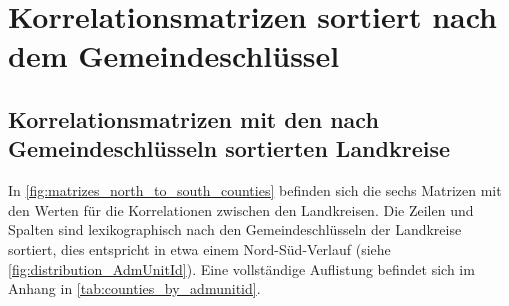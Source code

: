 \section{Korrelationsmatrizen sortiert nach dem Gemeindeschlüssel}
\subsection{Korrelationsmatrizen mit den nach Gemeindeschlüsseln sortierten Landkreise}
In \autoref{fig:matrizes_north_to_south_counties} befinden sich die sechs Matrizen mit den Werten für die Korrelationen zwischen den Landkreisen.
Die Zeilen und Spalten sind lexikographisch nach den Gemeindeschlüsseln der Landkreise sortiert, dies entspricht in etwa einem Nord-Süd-Verlauf (siehe \autoref{fig:distribution_AdmUnitId}). Eine vollständige Auflistung befindet sich im Anhang in \autoref{tab:counties_by_admunitid}.


